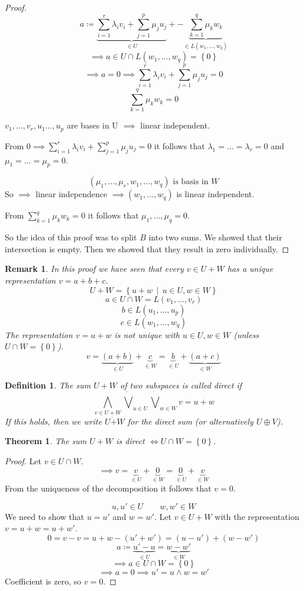 \documentclass[a4paper,landscape,twocolumn]{article}
\newcommand\set[1]{\left\{#1\right\}}
\newcommand\setdef[2]{\left\{#1\,\middle|\,#2\right\}}
\newtheorem{theorem}{Theorem}[section]
\newtheorem{defi}{Definition}[section]
\newtheorem{rem}{Remark}[section]
\begin{document}
\begin{proof}
  \[ a \coloneqq \underbrace{\sum_{i=1}^r \lambda_i v_i + \sum_{j=1}^p \mu_j u_j}_{\in U} + -\underbrace{\sum_{k=1}^q \mu_k w_k}_{\in L(w_1, \dots, w_q)} \]
  \[ \implies a \in U \cap L(w_1, \dots, w_q) = \set{0} \]
  \[ \implies a = 0 \implies \sum_{i=1}^r \lambda_i v_i + \sum_{j=1}^p \mu_j u_j = 0 \]
  \[ \sum_{k=1}^q \mu_k w_k = 0 \]

  $v_1, \dots, v_r, u_1 \dots, u_p$ are bases in U $\implies$ linear independent.

  From $0 \implies \sum_{i=1}^r \lambda_i v_i + \sum_{j=1}^p \mu_j u_j = 0$ it follows
  that $\lambda_1 = \dots = \lambda_r = 0$ and $\mu_1 = \dots = \mu_p = 0$.

  \[ (\mu_1, \dots, \mu_r, w_1, \dots, w_q) \text{ is basis in } W \]
  So $\implies$ linear independence $\implies (w_1, \dots, w_q)$ is linear independent.

  From $\sum_{k=1}^q \mu_k w_k = 0$ it follows that $\mu_1, \dots, \mu_q = 0$.

  So the idea of this proof was to split $B$ into two sums.
  We showed that their intersection is empty.
  Then we showed that they result in zero individually.
\end{proof}

\begin{rem}
  In this proof we have seen that every $v \in U + W$ has a unique representation $v = a + b + c$.
  \[ U+W = \setdef{u+w}{u \in U, w \in W} \]
  \[ a \in U \cap W = L(v_1, \dots, v_r) \]
  \[ b \in L(u_1, \dots, u_p) \]
  \[ c \in L(w_1, \dots, w_q) \]
  The representation $v = u + w$ is \emph{not} unique with $u \in U, w \in W$ (unless $U \cap W = \set{0}$).
  \[ v = \underbrace{(a + b)}_{\in U} + \underbrace{c}_{\in W} = \underbrace{b}_{\in U} + \underbrace{(a + c)}_{\in W} \]
\end{rem}

\begin{defi}
  The sum $U+W$ of two subspaces is called \emph{direct} if
  \[ \bigwedge_{v \in U+W} \dot\bigvee_{u\in U} \dot\bigvee_{w \in W} v = u + w \]
  If this holds, then we write $U \dot{+} W$ for the direct sum (or alternatively $U \oplus V$).
\end{defi}

\begin{theorem}
  \label{satz-4-8}
  The sum $U+W$ is direct $\iff U \cap W = \set{0}$.
\end{theorem}
\begin{proof}
  Let $v \in U \cap W$.
  \[ \implies v = \underbrace{v}_{\in U} + \underbrace{0}_{\in W} = \underbrace{0}_{\in U} + \underbrace{v}_{\in W} \]
  From the uniqueness of the decomposition it follows that $v = 0$.

  \[ u, u' \in U \qquad w, w' \in W\]
  We need to show that $u = u'$ and $w = w'$.
  Let $v \in U + W$ with the representation $v = u + w = u + w'$.
  \[ 0 = v - v = u + w - (u' + w') = (u - u') + (w - w') \]
  \[ a \coloneqq \underbrace{u' - u}_{\in U} = \underbrace{w - w'}_{\in W} \]
  \[ \implies a \in U \cap W = \set{0} \]
  \[ \implies a = 0 \implies u' = u \land w = w' \]
  Coefficient is zero, so $v = 0$.
\end{proof}
\end{document}
